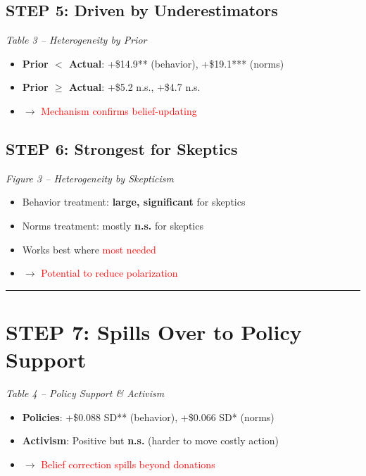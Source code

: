 \documentclass[10pt,a4paper]{article}
\begin{document}
\begin{minipage}[t]{0.48\textwidth}
\subsection*{STEP 5: Driven by Underestimators}
\textit{Table 3 -- Heterogeneity by Prior}
\begin{itemize}[nosep]
    \item \textbf{Prior $<$ Actual}: +\$14.9** (behavior), +\$19.1*** (norms)
    \item \textbf{Prior $\geq$ Actual}: +\$5.2 n.s., +\$4.7 n.s.
    \item $\rightarrow$ \textcolor{red}{Mechanism confirms belief-updating}
\end{itemize}
\end{minipage}
\hfill
\begin{minipage}[t]{0.48\textwidth}
\subsection*{STEP 6: Strongest for Skeptics}
\textit{Figure 3 -- Heterogeneity by Skepticism}
\begin{itemize}[nosep]
    \item Behavior treatment: \textbf{large, significant} for skeptics
    \item Norms treatment: mostly \textbf{n.s.} for skeptics
    \item Works best where \textcolor{red}{most needed}
    \item $\rightarrow$ \textcolor{red}{Potential to reduce polarization}
\end{itemize}
\end{minipage}

\vspace{8pt}
\hrule
\vspace{8pt}

\section*{STEP 7: Spills Over to Policy Support}
\textit{Table 4 -- Policy Support \& Activism}
\begin{itemize}[nosep]
    \item \textbf{Policies}: +\$0.088 SD** (behavior), +\$0.066 SD* (norms)
    \item \textbf{Activism}: Positive but \textbf{n.s.} (harder to move costly action)
    \item $\rightarrow$ \textcolor{red}{Belief correction spills beyond donations}
\end{itemize}

\vspace{12pt}
\begin{center}
\end{center}
\end{document}
